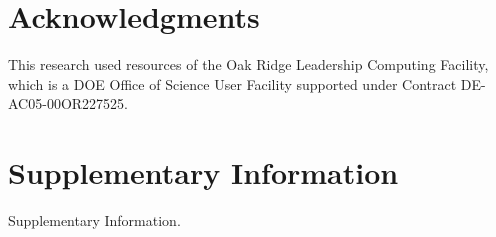 \documentclass[11pt]{article}
\begin{document}
\section{Acknowledgments} 
This research used resources of the Oak Ridge Leadership Computing Facility, which is a DOE Office of Science User Facility supported under Contract DE-AC05-00OR227525.
\section{Supplementary Information}
Supplementary Information.





%


\clearpage
\newpage


\newpage
\end{document}
